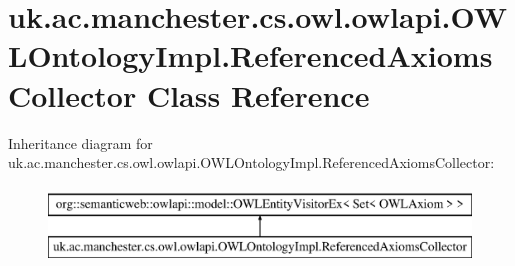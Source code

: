 \hypertarget{classuk_1_1ac_1_1manchester_1_1cs_1_1owl_1_1owlapi_1_1_o_w_l_ontology_impl_1_1_referenced_axioms_collector}{\section{uk.\-ac.\-manchester.\-cs.\-owl.\-owlapi.\-O\-W\-L\-Ontology\-Impl.\-Referenced\-Axioms\-Collector Class Reference}
\label{classuk_1_1ac_1_1manchester_1_1cs_1_1owl_1_1owlapi_1_1_o_w_l_ontology_impl_1_1_referenced_axioms_collector}
}
Inheritance diagram for uk.\-ac.\-manchester.\-cs.\-owl.\-owlapi.\-O\-W\-L\-Ontology\-Impl.\-Referenced\-Axioms\-Collector\-:\begin{figure}[H]
\begin{center}
\leavevmode
\includegraphics[height=2.000000cm]{classuk_1_1ac_1_1manchester_1_1cs_1_1owl_1_1owlapi_1_1_o_w_l_ontology_impl_1_1_referenced_axioms_collector}
\end{center}
\end{figure}
